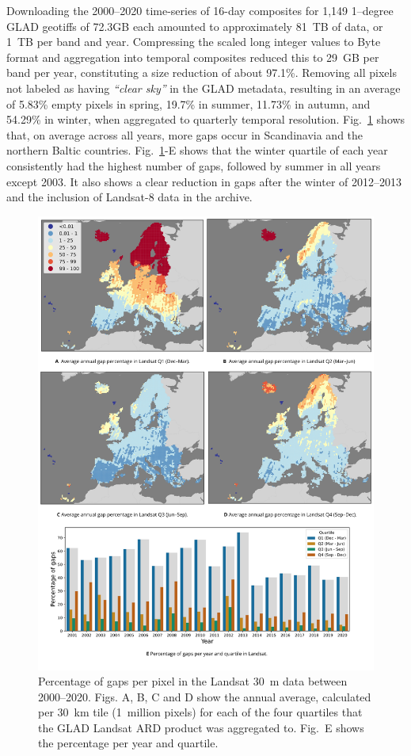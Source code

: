 Downloading the 2000--2020 time-series of 16-day composites for 1,149 1--degree GLAD geotiffs of 72.3GB each amounted to approximately 81~TB of data, or 1~TB per band and year. Compressing the scaled long integer values to Byte format and aggregation into temporal composites reduced this to 29~GB per band per year, constituting a size reduction of about 97.1\%. Removing all pixels not labeled as having \emph{``clear sky''} in the GLAD metadata, resulting in an average of 5.83\% empty pixels in spring, 19.7\% in summer, 11.73\% in autumn, and 54.29\% in winter, when aggregated to quarterly temporal resolution. Fig.\@~\ref{fig:4_gaps_landsat} shows that, on average across all years, more gaps occur in Scandinavia and the northern Baltic countries. Fig.\@~\ref{fig:4_gaps_landsat}-E shows that the winter quartile of each year consistently had the highest number of gaps, followed by summer in all years except 2003. It also shows a clear reduction in gaps after the winter of 2012--2013 and the inclusion of Landsat-8 data in the archive. 

\begin{figure}[!hbt]
    \includegraphics[width=\linewidth]{figs_02/fig_4_gaps_landsat.png}
    \caption{Percentage of gaps per pixel in the Landsat 30~m data between 2000--2020. Figs. A, B, C and D show the annual average, calculated per 30~km tile (1~million pixels) for each of the four quartiles that the GLAD Landsat ARD product was aggregated to. Fig.\@~E shows the percentage per year and quartile.}
    \label{fig:4_gaps_landsat}
\end{figure}

